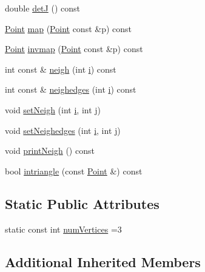 \begin{DoxyCompactItemize}
\item 
double \hyperlink{classTspeed_1_1Geo_1_1Triangle_a2737a2218f6ecbf80e34e360fd2c0ccd}{det\-J} () const 
\item 
\hyperlink{classTspeed_1_1Geo_1_1Point}{Point} \hyperlink{classTspeed_1_1Geo_1_1Triangle_a3ae4d893a8a0b5612aa5530914fbe704}{map} (\hyperlink{classTspeed_1_1Geo_1_1Point}{Point} const \&p) const 
\item 
\hyperlink{classTspeed_1_1Geo_1_1Point}{Point} \hyperlink{classTspeed_1_1Geo_1_1Triangle_aa607d5ba63bf021d0ca818c4727ff2c9}{invmap} (\hyperlink{classTspeed_1_1Geo_1_1Point}{Point} const \&p) const 
\item 
int const \& \hyperlink{classTspeed_1_1Geo_1_1Triangle_a9258f1265a916d2ed4ccf4c0d0ddcbb7}{neigh} (int \hyperlink{vtk__vector__out_8m_a6f6ccfcf58b31cb6412107d9d5281426}{i}) const 
\item 
int const \& \hyperlink{classTspeed_1_1Geo_1_1Triangle_a223bb2cb8fc96ea689daa5e7312aa7ca}{neighedges} (int \hyperlink{vtk__vector__out_8m_a6f6ccfcf58b31cb6412107d9d5281426}{i}) const 
\item 
void \hyperlink{classTspeed_1_1Geo_1_1Triangle_a1d71aed7672a87aed76934626d671ba7}{set\-Neigh} (int \hyperlink{vtk__vector__out_8m_a6f6ccfcf58b31cb6412107d9d5281426}{i}, int \hyperlink{vtk__mesh__out_8m_af1af736f0a1475ea44566768103395cb}{j})
\item 
void \hyperlink{classTspeed_1_1Geo_1_1Triangle_a8c174fbb7b71ef4625f021166bd1c8a6}{set\-Neighedges} (int \hyperlink{vtk__vector__out_8m_a6f6ccfcf58b31cb6412107d9d5281426}{i}, int \hyperlink{vtk__mesh__out_8m_af1af736f0a1475ea44566768103395cb}{j})
\item 
void \hyperlink{classTspeed_1_1Geo_1_1Triangle_a91d1f81ecb8f0524257ea821245d6c3f}{print\-Neigh} () const 
\item 
bool \hyperlink{classTspeed_1_1Geo_1_1Triangle_aad0c0d46a33f78fb05f87d923d65a5c6}{intriangle} (const \hyperlink{classTspeed_1_1Geo_1_1Point}{Point} \&) const 
\end{DoxyCompactItemize}
\subsection*{Static Public Attributes}
\begin{DoxyCompactItemize}
\item 
static const int \hyperlink{classTspeed_1_1Geo_1_1Triangle_af01040fae660e384b7919ed166ed88ae}{num\-Vertices} =3
\end{DoxyCompactItemize}
\subsection*{Additional Inherited Members}



